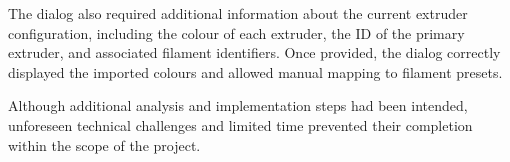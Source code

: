 The dialog also required additional information about the current extruder configuration, including the colour of each extruder, the ID of the primary extruder, and associated filament identifiers. 
Once provided, the dialog correctly displayed the imported colours and allowed manual mapping to filament presets.

Although additional analysis and implementation steps had been intended, unforeseen technical challenges and limited time prevented their completion within the scope of the project.